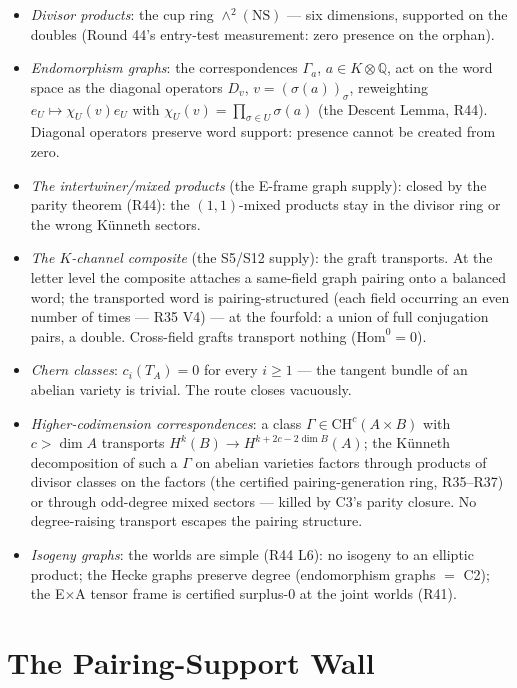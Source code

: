 \documentclass[11pt]{article}
\begin{document}
\begin{itemize}
\item[\textbf{C1}] \emph{Divisor products}: the cup ring $\wedge^2(\mathrm{NS})$ --- six
  dimensions, supported on the doubles (Round 44's entry-test measurement: zero presence on
  the orphan).
\item[\textbf{C2}] \emph{Endomorphism graphs}: the correspondences $\Gamma_a$,
  $a \in K\otimes\mathbb{Q}$, act on the word space as the diagonal operators
  $D_v$, $v = (\sigma(a))_\sigma$, reweighting $e_U \mapsto \chi_U(v) e_U$ with
  $\chi_U(v) = \prod_{\sigma\in U}\sigma(a)$ (the Descent Lemma, R44).  Diagonal operators
  preserve word support: presence cannot be created from zero.
\item[\textbf{C3}] \emph{The intertwiner/mixed products} (the E-frame graph supply): closed
  by the parity theorem (R44): the $(1,1)$-mixed products stay in the divisor ring or the
  wrong K\"unneth sectors.
\item[\textbf{C4}] \emph{The $K$-channel composite} (the S5/S12 supply): the graft
  transports.  At the letter level the composite attaches a same-field graph pairing onto a
  balanced word; the transported word is pairing-structured (each field occurring an even
  number of times --- R35 V4) --- at the fourfold: a union of full conjugation pairs, a
  double.  Cross-field grafts transport nothing ($\mathrm{Hom}^0 = 0$).
\item[\textbf{C5}] \emph{Chern classes}: $c_i(T_A) = 0$ for every $i \geq 1$ --- the tangent
  bundle of an abelian variety is trivial.  The route closes vacuously.
\item[\textbf{C6}] \emph{Higher-codimension correspondences}: a class
  $\Gamma \in \mathrm{CH}^c(A\times B)$ with $c > \dim A$ transports
  $H^k(B)\to H^{k+2c-2\dim B}(A)$; the K\"unneth decomposition of such a $\Gamma$ on
  abelian varieties factors through products of divisor classes on the factors (the
  certified pairing-generation ring, R35--R37) or through odd-degree mixed sectors ---
  killed by C3's parity closure.  No degree-raising transport escapes the pairing
  structure.
\item[\textbf{C7}] \emph{Isogeny graphs}: the worlds are simple (R44 L6): no isogeny to an
  elliptic product; the Hecke graphs preserve degree (endomorphism graphs $=$ C2); the
  E$\times$A tensor frame is certified surplus-$0$ at the joint worlds (R41).
\end{itemize}

\section{The Pairing-Support Wall}
\end{document}
